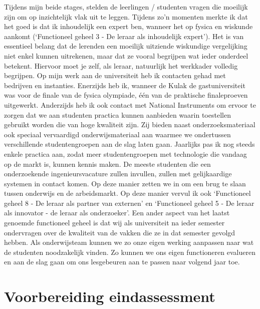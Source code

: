 \documentclass[a4paper,12pt,twoside]{article}%
\begin{document}
Tijdens mijn beide stages, stelden de leerlingen / studenten vragen die moeilijk zijn om op inzichtelijk vlak uit te leggen. Tijdens zo'n momenten merkte ik dat het goed is dat ik inhoudelijk een expert ben, wanneer het op fysica en wiskunde aankomt (`Functioneel geheel 3 - De leraar als inhoudelijk expert'). Het is van essentieel belang dat de lerenden een moeilijk uitziende wiskundige vergelijking niet enkel kunnen uitrekenen, maar dat ze vooral begrijpen wat ieder onderdeel betekent. Hiervoor moet je zelf, als leraar, natuurlijk het werkkader volledig begrijpen.\newline
Op mijn werk aan de universiteit heb ik contacten gehad  met bedrijven en instanties. Enerzijds heb ik, wanneer de Kulak de gastuniversiteit was voor de finale van de fysica olympiade, één van de praktische finaleproeven uitgewerkt. Anderzijds heb ik ook contact met National Instruments om ervoor te zorgen dat we aan studenten practica kunnen aanbieden waarin toestellen gebruikt worden die van hoge kwaliteit zijn. Zij bieden naast onderzoeksmateriaal ook speciaal vervaardigd onderwijsmateriaal aan waarmee we ondertussen verschillende studentengroepen aan de slag laten gaan. Jaarlijks pas ik nog steeds enkele practica aan, zodat meer studentengroepen met technologie die vandaag op de markt is, kunnen kennis maken. De meeste studenten die een onderzoekende ingenieursvacature zullen invullen, zullen met gelijkaardige systemen in contact komen. Op deze manier zetten we in om een brug te slaan tussen onderwijs en de arbeidsmarkt.  Op deze manier vervul ik ook `Functioneel geheel 8 - De leraar als partner van externen' en `Functioneel geheel 5 - De leraar als innovator - de leraar als onderzoeker'.\newline
Een ander aspect van het laatst genoemde functioneel geheel is dat wij als universiteit na ieder semester ondervragen over de kwaliteit van de vakken die ze in dat semester gevolgd hebben. Als onderwijsteam kunnen we zo onze eigen werking aanpassen naar wat de studenten noodzakelijk vinden. Zo kunnen we ons eigen functioneren evalueren en aan de slag gaan om ons lesgebeuren aan te passen naar volgend jaar toe.\newline 












\newpage
\section{Voorbereiding eindassessment}
\end{document}
